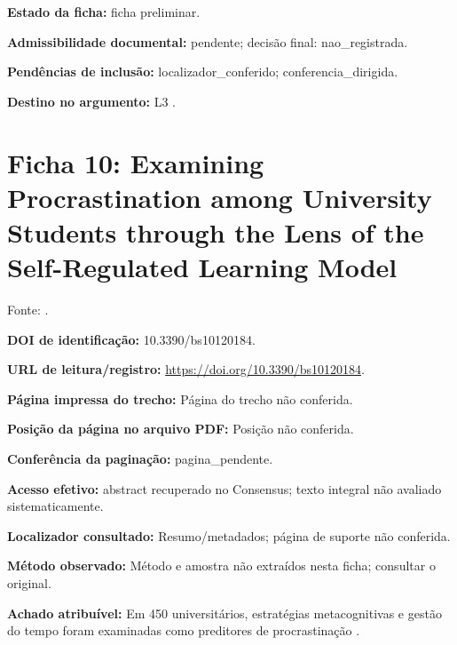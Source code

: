 \noindent\textbf{Estado da ficha:} ficha preliminar.\par\medskip

\noindent\textbf{Admissibilidade documental:} pendente; decisão final: nao\_registrada.\par\medskip

\noindent\textbf{Pendências de inclusão:} localizador\_conferido; conferencia\_dirigida.\par\medskip

\noindent\textbf{Destino no argumento:} L3 .

\clearpage\section*{Ficha 10: Examining Procrastination among University Students through the Lens of the Self-Regulated Learning Model}

Fonte: \citet{education_limone2020}.

\noindent\textbf{DOI de identificação:} 10.3390/bs10120184.\par\medskip

\noindent\textbf{URL de leitura/registro:} \url{https://doi.org/10.3390/bs10120184}.\par\medskip

\noindent\textbf{Página impressa do trecho:} Página do trecho não conferida.\par\medskip

\noindent\textbf{Posição da página no arquivo PDF:} Posição não conferida.\par\medskip

\noindent\textbf{Conferência da paginação:} pagina\_pendente.\par\medskip

\noindent\textbf{Acesso efetivo:} abstract recuperado no Consensus; texto integral não avaliado sistematicamente.\par\medskip

\noindent\textbf{Localizador consultado:} Resumo/metadados; página de suporte não conferida.\par\medskip

\noindent\textbf{Método observado:} Método e amostra não extraídos nesta ficha; consultar o original.\par\medskip

\noindent\textbf{Achado atribuível:} Em 450 universitários, estratégias metacognitivas e gestão do tempo foram examinadas como preditores de procrastinação \citep{education_limone2020}.\par\medskip

